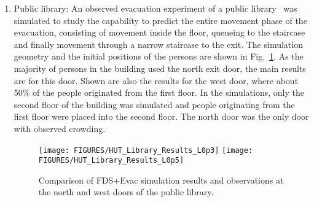 \documentclass[12pt,a4paper,final,twoside]{stylevk}
\begin{document}
\begin{enumerate}
The results using a most sophisticated way of defining staircases
(type 3) are compared to the observed values in
Fig.~\ref{Fig_StairType3}.  In these simulations, the whole stairs are
modelled as one single object using  namelist, where
agents move at reduced speed on stairs flights and normal speeds on
landings.  Reducing the unimpeded walking speed by a factor
$\gtrsim$0.6 seems to give a good agreement with the observations.
Note that there exists some queuing at the final exit door opening to
the street in the experiment and this is also seen in the simulation
results, when the speed reduction parameter is not too low.  For the
case with $\lambda_i$=0.3 the specific flow is about 1.18~p/s/m and
for the case with $\lambda_i$=0.5 the flow is about 1.40~p/s/m at the
final exit door (speed factor 0.75).  Similar flows were also obtained
when using the other staircase models.  When a speed reduction factor
$\gtrsim$0.6 is used seems to produce more or less quite constant flow
at the exit door, \emph{i.e.}, at these speed reduction values the
stairs are feeding the front door fast enough.
%

\begin{figure}[!tb]
  \centerline{\texttt{[image: FIGURES/Library\_Kuva2]}} 
  \caption{A snapshot from a FDS+Evac simulation shows the geometry of
    the FDS+Evac model for the second floor of the public
    library.}\label{Fig_Kirjasto}
\end{figure}

%
\item Public library: An observed evacuation experiment of a public
  library~\cite{Hostikka07b} was simulated to study the capability to
  predict the entire movement phase of the evacuation, consisting of
  movement inside the floor, queueing to the staircase and finally
  movement through a narrow staircase to the exit.  The simulation
  geometry and the initial positions of the persons are shown in
  Fig.~\ref{Fig_Kirjasto}.  As the majority of persons in the building
  used the north exit door, the main results are for this door.  Shown
  are also the results for the west door, where about 50\% of the
  people originated from the first floor.  In the simulations, only
  the second floor of the building was simulated and people
  originating from the first floor were placed into the second floor.
  The north door was the only door with observed crowding.

%
\begin{figure}[!tb]
  \centerline{
    \texttt{[image: FIGURES/HUT\_Library\_Results\_L0p3]} 
    \texttt{[image: FIGURES/HUT\_Library\_Results\_L0p5]} 
  }
  \caption{Comparison of FDS+Evac simulation results and observations
    at the north and west doors of the public
    library.}\label{Fig_KirjastoResults}
\end{figure}
  

\end{enumerate}
\end{document}
